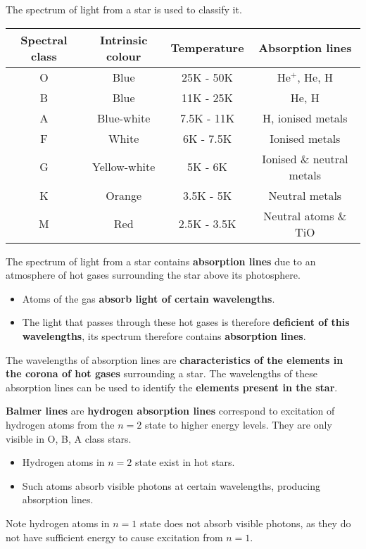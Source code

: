 The spectrum of light from a star is used to classify it.

\begin{center}
    \begin{tabular}{|c|c|c|c|}
        \hline
        Spectral class & Intrinsic colour & Temperature & Absorption lines\\
        \hline
        O & Blue & 25K - 50K & He$^+$, He, H\\
        B & Blue & 11K - 25K & He, H\\
        A & Blue-white & 7.5K - 11K & H, ionised metals\\
        F & White & 6K - 7.5K & Ionised metals\\
        G & Yellow-white & 5K - 6K & Ionised \& neutral metals\\
        K & Orange & 3.5K - 5K & Neutral metals\\
        M & Red & 2.5K - 3.5K & Neutral atoms \& TiO\\
        \hline
    \end{tabular}
\end{center}

The spectrum of light from a star contains \textbf{absorption lines} due to an atmosphere of hot gases surrounding the star above its photosphere.
\begin{itemize}
    \item Atoms of the gas \textbf{absorb light of certain wavelengths}.
    \item The light that passes through these hot gases is therefore \textbf{deficient of this wavelengths}, its spectrum therefore contains \textbf{absorption lines}.
\end{itemize}

The wavelengths of absorption lines are \textbf{characteristics of the elements in the corona of hot gases} surrounding a star.  The wavelengths of these absorption lines can be used to identify the \textbf{elements present in the star}.

\textbf{Balmer lines} are \textbf{hydrogen absorption lines} correspond to excitation of hydrogen atoms from the $n=2$ state to higher energy levels. They are only visible in O, B, A class stars.
\begin{itemize}
    \item Hydrogen atoms in $n=2$ state exist in hot stars.
    \item Such atoms absorb visible photons at certain wavelengths, producing absorption lines.
\end{itemize}

Note hydrogen atoms in $n=1$ state does not absorb visible photons, as they do not have sufficient energy to cause excitation from $n=1$.
